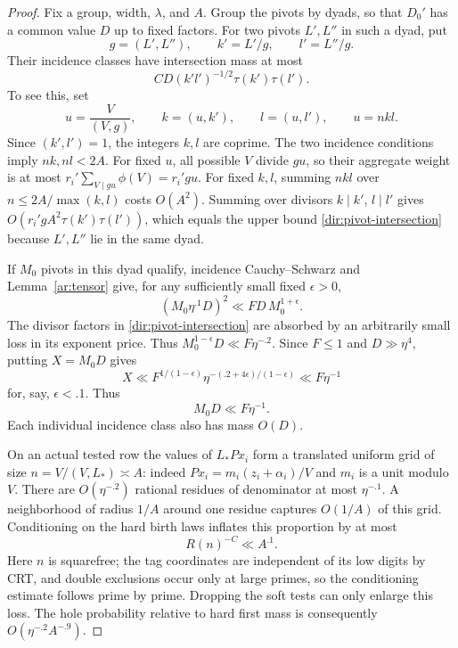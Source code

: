\begin{proof}
Fix a group, width, $\lambda$, and $A$. Group the pivots by dyads, so
that $D_0'$ has a common value $D$ up to fixed factors. For two pivots
$L',L''$ in such a dyad, put
\[
 g=(L',L''),\qquad k'=L'/g,\qquad l'=L''/g.
\]
Their incidence classes have intersection mass at most
\begin{equation}\label{dir:pivot-intersection}
 C D(k'l')^{-1/2}\tau(k')\tau(l').
\end{equation}
To see this, set
\[
 u=\frac{V}{(V,g)},\qquad k=(u,k'),\qquad l=(u,l'),\qquad u=nkl.
\]
Since $(k',l')=1$, the integers $k,l$ are coprime. The two incidence
conditions imply $nk,nl<2A$. For fixed $u$, all possible $V$ divide
$gu$, so their aggregate weight is at most
$r_i'\sum_{V\mid gu}\phi(V)=r_i'gu$. For fixed $k,l$, summing $nkl$
over $n\le2A/\max(k,l)$ costs $O(A^2)$. Summing over divisors
$k\mid k'$, $l\mid l'$ gives
$O(r_i'g A^2\tau(k')\tau(l'))$, which equals the upper bound
\eqref{dir:pivot-intersection} because $L',L''$ lie in the same dyad.

If $M_0$ pivots in this dyad qualify, incidence Cauchy--Schwarz and
Lemma~\ref{ar:tensor} give, for any sufficiently small fixed
$\epsilon>0$,
\[
 (M_0\eta^{.1}D)^2
       \ll F D\,M_0^{1+\epsilon}.
\]
The divisor factors in \eqref{dir:pivot-intersection} are absorbed by
an arbitrarily small loss in its exponent price. Thus
$M_0^{1-\epsilon}D\ll F\eta^{-.2}$. Since $F\le1$ and
$D\gg\eta^4$, putting $X=M_0D$ gives
\[
 X\ll
 F^{1/(1-\epsilon)}
 \eta^{-(.2+4\epsilon)/(1-\epsilon)}
 \ll F\eta^{-1}
\]
for, say, $\epsilon<.1$. Thus
\begin{equation}\label{dir:pivot-total}
 M_0D\ll F\eta^{-1}.
\end{equation}
Each individual incidence class also has mass $O(D)$.

On an actual tested row the values of $L_*P x_i$ form a translated
uniform grid of size
$n=V/(V,L_*)\asymp A$: indeed $P x_i=m_i(z_i+\alpha_i)/V$ and
$m_i$ is a unit modulo $V$. There are $O(\eta^{-.2})$ rational
residues of denominator at most $\eta^{-.1}$. A neighborhood of
radius $1/A$ around one residue captures $O(1/A)$ of this grid.
Conditioning on the hard birth laws inflates this proportion by at
most
\[
 R(n)^{-C}\ll A^{.1}.
\]
Here $n$ is squarefree; the tag coordinates are independent of its
low digits by CRT, and double exclusions occur only at large primes,
so the conditioning estimate follows prime by prime. Dropping the
soft tests can only enlarge this loss. The hole probability relative
to hard first mass is consequently
$O(\eta^{-.2}A^{-.9})$.


\end{proof}
